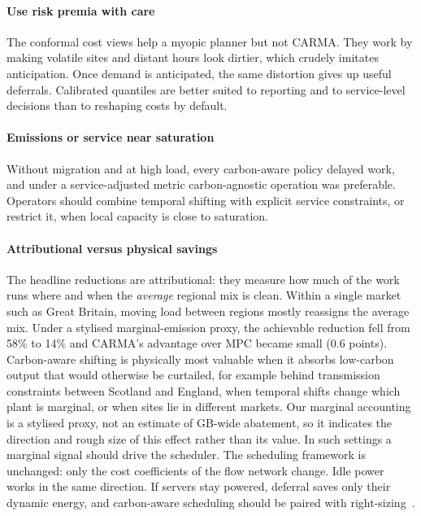 \paragraph{Use risk premia with care} The conformal cost views help a myopic planner but not CARMA. They work by making volatile sites and distant hours look dirtier, which crudely imitates anticipation. Once demand is anticipated, the same distortion gives up useful deferrals. Calibrated quantiles are better suited to reporting and to service-level decisions than to reshaping costs by default.

\paragraph{Emissions or service near saturation} Without migration and at high load, every carbon-aware policy delayed work, and under a service-adjusted metric carbon-agnostic operation was preferable. Operators should combine temporal shifting with explicit service constraints, or restrict it, when local capacity is close to saturation.

\paragraph{Attributional versus physical savings} The headline reductions are attributional: they measure how much of the work runs where and when the \emph{average} regional mix is clean. Within a single market such as Great Britain, moving load between regions mostly reassigns the average mix. Under a stylised marginal-emission proxy, the achievable reduction fell from 58\% to 14\% and CARMA's advantage over MPC became small (0.6 points). Carbon-aware shifting is physically most valuable when it absorbs low-carbon output that would otherwise be curtailed, for example behind transmission constraints between Scotland and England, when temporal shifts change which plant is marginal, or when sites lie in different markets. Our marginal accounting is a stylised proxy, not an estimate of GB-wide abatement, so it indicates the direction and rough size of this effect rather than its value. In such settings a marginal signal should drive the scheduler. The scheduling framework is unchanged: only the cost coefficients of the flow network change. Idle power works in the same direction. If servers stay powered, deferral saves only their dynamic energy, and carbon-aware scheduling should be paired with right-sizing~\cite{lin2013dynamic}.

